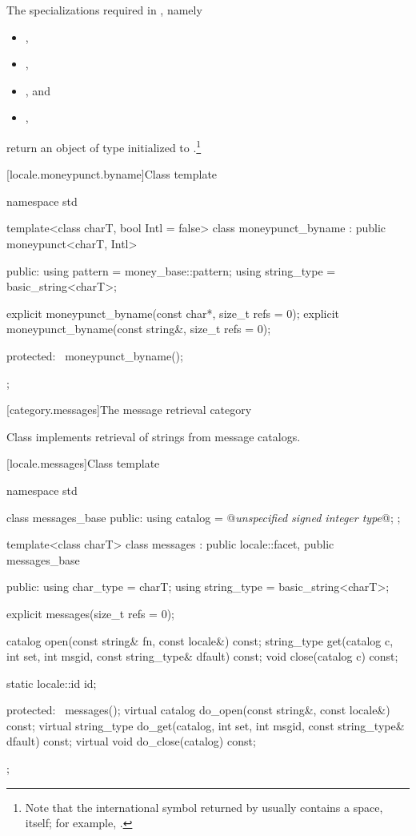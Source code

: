 \begin{itemdescr}
\pnum
\returns
The specializations required in , namely
\begin{itemize}
\item {},
\item {},
\item {},
and
\item {},
\end{itemize}
return an object of type
initialized to
.\footnote{Note that the international
symbol returned by
usually contains a space, itself;
for example, .}
\end{itemdescr}

[locale.moneypunct.byname]{Class template }

%
\begin{codeblock}
namespace std {
  template<class charT, bool Intl = false>
  class moneypunct_byname : public moneypunct<charT, Intl> {
    public:
      using pattern     = money_base::pattern;
      using string_type = basic_string<charT>;

      explicit moneypunct_byname(const char*, size_t refs = 0);
      explicit moneypunct_byname(const string&, size_t refs = 0);

    protected:
      ~moneypunct_byname();
    };
}
\end{codeblock}

[category.messages]{The message retrieval category}

\pnum
Class
implements retrieval of strings from message catalogs.

[locale.messages]{Class template }

%
\begin{codeblock}
namespace std {
  class messages_base {
  public:
    using catalog = @\textit{unspecified signed integer type}@;
  };

  template<class charT>
    class messages : public locale::facet, public messages_base {
    public:
      using char_type   = charT;
      using string_type = basic_string<charT>;

      explicit messages(size_t refs = 0);

      catalog open(const string& fn, const locale&) const;
      string_type get(catalog c, int set, int msgid,
                       const string_type& dfault) const;
      void close(catalog c) const;

      static locale::id id;

    protected:
      ~messages();
      virtual catalog do_open(const string&, const locale&) const;
      virtual string_type do_get(catalog, int set, int msgid,
                                 const string_type& dfault) const;
      virtual void do_close(catalog) const;
    };
}
\end{codeblock}

